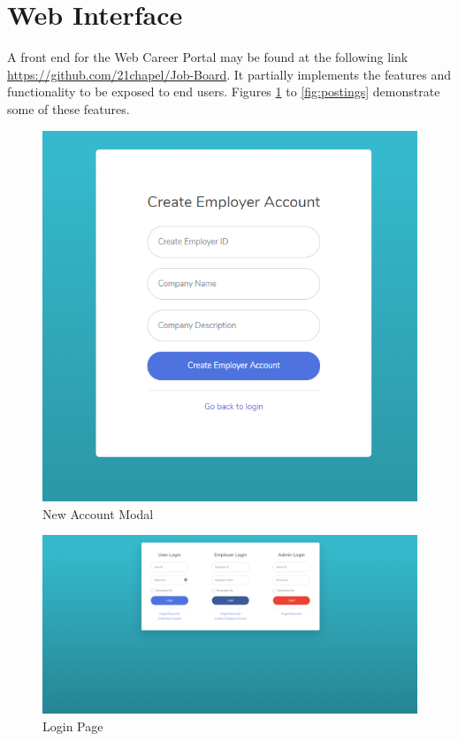 \documentclass{article}
\begin{document}
    \section{Web Interface}
        A front end for the Web Career Portal may be found at the following link
        \url{https://github.com/21chapel/Job-Board}. It partially implements the features and functionality to be
        exposed to end users. Figures \ref{fig:create} to \ref{fig:postings} demonstrate some of these features.
        \begin{figure}
            \centering
            \includegraphics[scale=0.5]{create-user}
            \caption{New Account Modal}
            \label{fig:create}
        \end{figure}
        \begin{figure}
            \centering
            \includegraphics[scale=0.25]{login}
            \caption{Login Page}
            \label{fig:login}
        \end{figure}
\end{document}
